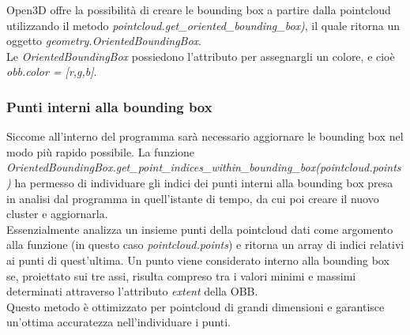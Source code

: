 \documentclass[italian]{article}
\begin{document}
Open3D offre la possibilità di creare le bounding box a partire dalla pointcloud utilizzando il metodo \textit{pointcloud.get\_oriented\_bounding\_box)}, il quale ritorna un oggetto
\textit{geometry.OrientedBoundingBox}.\\
Le \textit{OrientedBoundingBox} possiedono l'attributo per assegnargli un colore, e cioè \textit{obb.color = [r,g,b]}.
\subsubsection{Punti interni alla bounding box}
Siccome all'interno del programma sarà necessario aggiornare le bounding box nel modo più rapido possibile. La funzione\\ \textit{OrientedBoundingBox.get\_point\_indices\_within\_bounding\_box(pointcloud.points)} ha permesso di individuare gli indici dei punti interni alla bounding box presa in analisi dal programma in quell'istante di tempo, da cui poi creare il nuovo cluster e aggiornarla.\\ 
Essenzialmente analizza un insieme punti della pointcloud dati come argomento alla funzione (in questo caso \textit{pointcloud.points}) e ritorna un array di indici relativi ai punti di quest'ultima. Un punto viene considerato interno alla bounding box se, proiettato sui tre assi, risulta compreso tra i valori minimi e massimi determinati attraverso l'attributo \textit{extent} della OBB.\\
Questo metodo è ottimizzato per pointcloud di grandi dimensioni e garantisce un'ottima accuratezza nell'individuare i punti.
\end{document}
